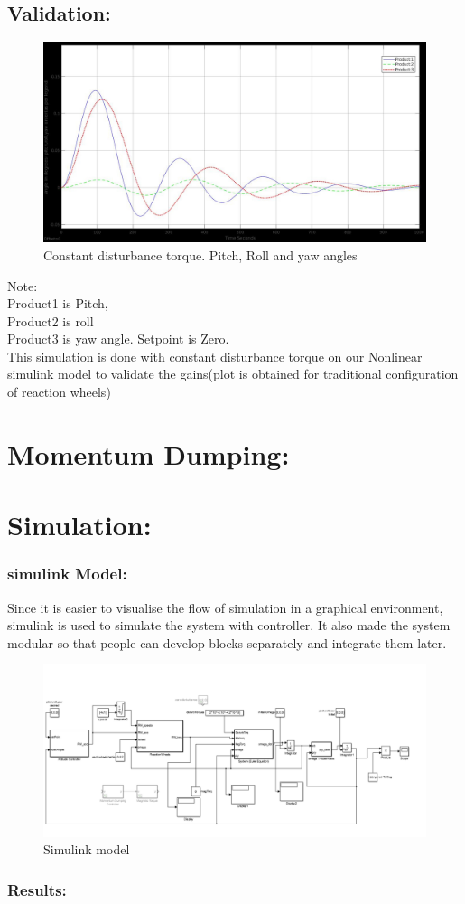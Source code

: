 \documentclass[10pt,a4paper]{report}
\begin{document}
\section{Validation:}
\begin{figure}[H]
	\centering
	\includegraphics[width=1.0\linewidth]{simulation_at_constantTOrq_pryangles}
	\caption{Constant disturbance torque. Pitch, Roll and yaw angles}
	\label{Constant disturbance torque. Pitch, Roll and yaw angles}
\end{figure}
	Note: \\Product1 is Pitch, \\Product2 is roll \\ Product3 is yaw angle.
	Setpoint is Zero. \\
This simulation is done with constant disturbance torque on our Nonlinear simulink model to validate the gains(plot is obtained for traditional configuration of reaction wheels)
\chapter{Momentum Dumping:}

\chapter{Simulation:}
\subsection{simulink Model:}
Since it is easier to visualise the flow of simulation in a graphical environment, simulink is used to simulate the system with controller.
It also made the system modular so that people can develop blocks separately and integrate them later.
\begin{figure}[H]
\centering
\includegraphics[scale=0.3]{Untitled1.png}
\caption{Simulink model}
\end{figure}
\subsection{Results:}
\end{document}

